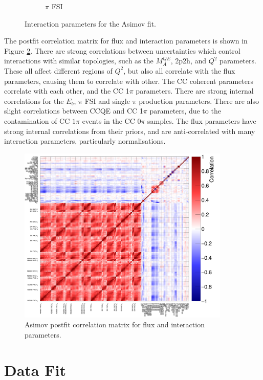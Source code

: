 \begin{figure}[!htbp]
\begin{subfigure}{0.49\textwidth}
  \caption{$\pi$ FSI}
\end{subfigure}
\caption{Interaction parameters for the Asimov fit.}
\label{fig:asmvxsec}
\end{figure}

The postfit correlation matrix for flux and interaction parameters is shown in Figure \ref{fig:asmvpostfitcov}. There are strong correlations between uncertainties which control interactions with similar topologies, such as the $M^{QE}_A$, 2p2h, and $Q^2$ parameters. These all affect different regions of $Q^2$, but also all correlate with the flux parameters, causing them to correlate with other. The CC coherent parameters correlate with each other, and the CC 1$\pi$ parameters. There are strong internal correlations for the $E_b$, $\pi$ FSI and single $\pi$ production parameters. There are also slight correlations between CCQE and CC 1$\pi$ parameters, due to the contamination of CC $1\pi$ events in the CC 0$\pi$ samples. The flux parameters have strong internal correlations from their priors, and are anti-correlated with many interaction parameters, particularly normalisations.

\begin{figure}[!htbp]
\centering
\includegraphics*[width=0.9\textwidth,clip]{figs/Mach3AsmvCorr}
\caption{Asimov postfit correlation matrix for flux and interaction parameters.}\label{fig:asmvpostfitcov}
\end{figure}

\section{Data Fit}\label{sec:datafit}

